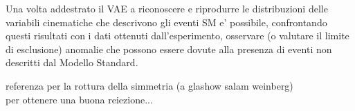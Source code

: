 Una volta addestrato il VAE a riconoscere e riprodurre le distribuzioni delle variabili cinematiche che descrivono gli eventi SM e' possibile, confrontando questi risultati con i dati ottenuti dall'esperimento, osservare (o valutare il limite di esclusione) anomalie che possono essere dovute alla presenza di eventi non descritti dal Modello Standard.


\color{red}
referenza per la rottura della simmetria (a glashow salam weinberg) \\
per ottenere una buona reiezione...\\

\color{black}

\newpage

